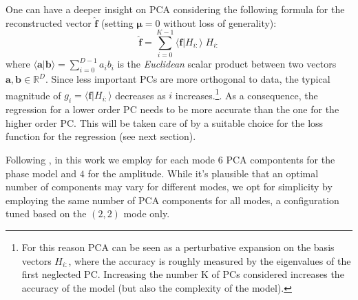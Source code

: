 \documentclass[twocolumn,showpacs,preprintnumbers,nofootinbib,prd,
superscriptaddress,10pt]{revtex4-2}
\newcommand{\R}{\mathbb{R}}
\begin{document}
One can have a deeper insight on PCA considering the following formula for the reconstructed vector $\hat{\mathbf{f}}$ (setting $\boldsymbol{\mu}=0$ without loss of generality):
\begin{equation} \label{eq:perturbative_exp}
	\hat{\mathbf{f}} = \sum_{i=0}^{K-1} \langle \mathbf{f} | H_{i:} \rangle \; H_{i:}
\end{equation}
%
where $\langle \mathbf{a} | \mathbf{b} \rangle = \sum_{i=0}^{D-1} a_i b_i$ is the {\it Euclidean} scalar product between two vectors $\mathbf{a}, \mathbf{b} \in \R^D$.
%
Since less important PCs are more orthogonal to data, the typical magnitude of $g_i = \langle \mathbf{f} | H_{i:} \rangle$ decreases as $i$ increases.\footnote{For this reason PCA can be seen as a perturbative expansion on the basis vectors $H_{i:}$, where the accuracy is roughly measured by the eigenvalues of the first neglected PC. Increasing the number K of PCs considered increases the accuracy of the model (but also the complexity of the model).}.
As a consequence, the regression for a lower order PC needs to be more accurate than the one for the higher order PC. This will be taken care of by a suitable choice for the loss function for the regression (see next section).

Following \cite{Schmidt:2020yuu}, in this work we employ for each mode $6$ PCA compontents for the phase model and $4$ for the amplitude.
While it's plausible that an optimal number of components may vary for different modes, we opt for simplicity by employing the same number of PCA components for all modes, a configuration tuned based on the $(2,2)$ mode only.
\end{document}
